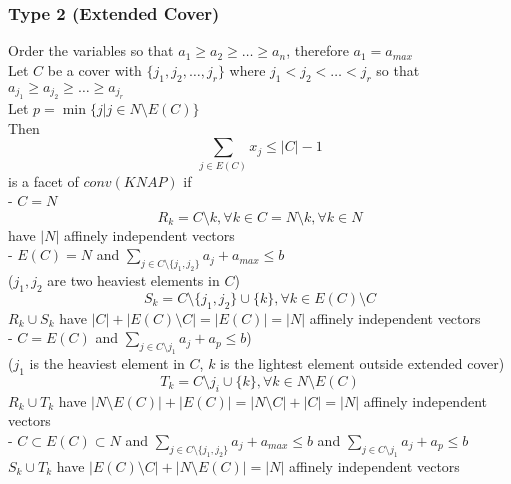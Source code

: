 				\subsubsection{Type 2 (Extended Cover)}
					Order the variables so that $a_1 \ge a_2 \ge \dots \ge a_n$, therefore $a_1 = a_{max}$\\
					Let $C$ be a cover with $\{j_1, j_2, \dots, j_r\}$ where $j_1 < j_2 < \dots < j_r$ so that $a_{j_1} \ge a_{j_2} \ge \dots \ge a_{j_r}$\\
					Let $p = \min\{j | j\in N \setminus E(C)\}$\\
					Then
					\begin{equation}
						\sum_{j\in E(C)} x_j \le |C| - 1 
					\end{equation}
					is a facet of $conv(KNAP)$ if\\
					- $C = N$\\
					\begin{equation}
						R_k = C\setminus k, \forall k \in C = N \setminus k, \forall k \in N 
					\end{equation}
					have $|N|$ affinely independent vectors\\
					- $E(C) = N$ and $\sum_{j\in C \setminus \{j_1, j_2\}} a_j + a_{max} \le b$\\
					 ($j_1, j_2$ are two heaviest elements in $C$)
					\begin{equation}
						S_k = C\setminus \{j_1, j_2\}\cup \{k\}, \forall k\in E(C)\setminus C 
					\end{equation}
					$R_k\cup S_k$ have $|C|+|E(C) \setminus C| = |E(C)| = |N|$ affinely independent vectors\\
					- $C = E(C)$ and $\sum_{j\in C \setminus j_1} a_j + a_p \le b$)\\
					 ($j_1$ is the heaviest element in $C$, $k$ is the lightest element outside extended cover)
					\begin{equation}
						T_k = C \setminus j_i \cup \{k\}, \forall k\in N\setminus E(C) 
					\end{equation}
					$R_k \cup T_k$ have $|N \setminus E(C)| + |E(C)| = |N\setminus C| + |C| = |N|$ affinely independent vectors\\
					- $C \subset E(C) \subset N$ and $\sum_{j\in C \setminus \{j_1, j_2\}} a_j + a_{max} \le b$ and $\sum_{j\in C \setminus j_1} a_j + a_p \le b$\\
					$S_k \cup T_k$ have $|E(C) \setminus C| + |N \setminus E(C)| = |N|$ affinely independent vectors


